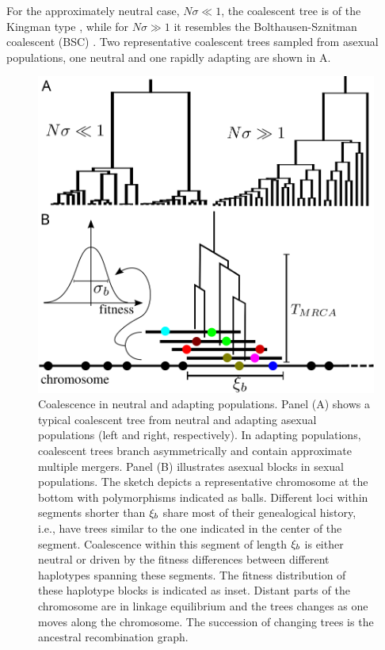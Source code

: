 For the approximately neutral case, $N\sigma\ll
1$, the coalescent tree is of the Kingman type
\cite{Kingman:1982p28911}, while for $N\sigma \gg 1$ it resembles the
Bolthausen-Sznitman coalescent (BSC)
\cite{Bolthausen:1998p47390,Brunet:2007p18866}. Two representative
coalescent trees sampled from asexual populations, one neutral and one
rapidly adapting are shown in \FigSketch A.  


\begin{figure}[th]
  \centering
  \includegraphics[width=0.98\columnwidth]{sketch}
  \caption{
    Coalescence in neutral and adapting populations. Panel (A) shows a
    typical coalescent tree from neutral and adapting asexual
    populations (left and right, respectively). In adapting populations,
    coalescent trees branch asymmetrically and contain
    approximate multiple mergers. Panel (B) illustrates 
    asexual blocks in sexual populations. The sketch depicts a
    representative chromosome at the bottom with polymorphisms
    indicated as balls. Different loci within segments shorter than
    ${\xi_b}$ share  most of their genealogical history, i.e., have
    trees similar to the one indicated in the center of the
    segment. Coalescence within this segment of length ${\xi_b}$ is
    either neutral or driven by the fitness differences between
    different haplotypes spanning these segments. 
    The fitness distribution of these haplotype blocks is indicated as
    inset. Distant parts of the chromosome are in linkage
    equilibrium and the trees changes as one
    moves along the chromosome. The succession of changing trees
    is the ancestral recombination graph.  
  }
  \label{fig:sketch}
\end{figure}

